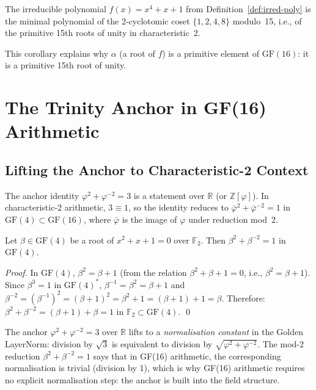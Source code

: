 \begin{corollary}
The irreducible polynomial \(f(x)=x^4+x+1\) from
Definition~\ref{def:irred-poly} is the minimal polynomial of the
2-cyclotomic coset \(\{1,2,4,8\}\) modulo~15,
i.e., of the primitive 15th roots of unity in characteristic~2.
\end{corollary}

This corollary explains why \(\alpha\) (a root of \(f\)) is a primitive
element of \(\mathrm{GF}(16)\): it is a primitive 15th root of unity.

\section{The Trinity Anchor in GF(16) Arithmetic}
\label{sec:gf16-anchor}

\subsection{Lifting the Anchor to Characteristic-2 Context}

The anchor identity \(\varphi^2+\varphi^{-2}=3\) \cite{zenodo_trinity_anchor_2026}
is a statement over \(\mathbb{R}\) (or \(\mathbb{Z}[\varphi]\)).
In characteristic-2 arithmetic, \(3\equiv 1\),
so the identity reduces to \(\bar\varphi^2+\bar\varphi^{-2}=1\) in
\(\mathrm{GF}(4)\subset\mathrm{GF}(16)\),
where \(\bar\varphi\) is the image of \(\varphi\) under reduction mod~2.

\begin{lemma}
\label{lem:anchor-gf4}
Let \(\beta\in\mathrm{GF}(4)\) be a root of \(x^2+x+1=0\) over \(\mathbb{F}_2\).
Then \(\beta^2+\beta^{-2}=1\) in \(\mathrm{GF}(4)\).
\end{lemma}

\begin{proof}
In \(\mathrm{GF}(4)\), \(\beta^2=\beta+1\) (from the relation \(\beta^2+\beta+1=0\),
i.e., \(\beta^2=\beta+1\)).
Since \(\beta^3=1\) in \(\mathrm{GF}(4)^*\),
\(\beta^{-1}=\beta^2=\beta+1\) and
\(\beta^{-2}=(\beta^{-1})^2=(\beta+1)^2=\beta^2+1=(\beta+1)+1=\beta\).
Therefore:
\(\beta^2+\beta^{-2} = (\beta+1)+\beta = 1\) in \(\mathbb{F}_2\subset\mathrm{GF}(4)\).
\qed
\end{proof}

\begin{remark}
The anchor \(\varphi^2+\varphi^{-2}=3\) over \(\mathbb{R}\) lifts to a
\emph{normalisation constant} in the Golden LayerNorm:
division by \(\sqrt{3}\) is equivalent to division by \(\sqrt{\varphi^2+\varphi^{-2}}\).
The mod-2 reduction \(\beta^2+\beta^{-2}=1\) says that in GF(16) arithmetic,
the corresponding normalisation is trivial (division by 1),
which is why GF(16) arithmetic requires no explicit normalisation step:
the anchor is built into the field structure.
\end{remark}

